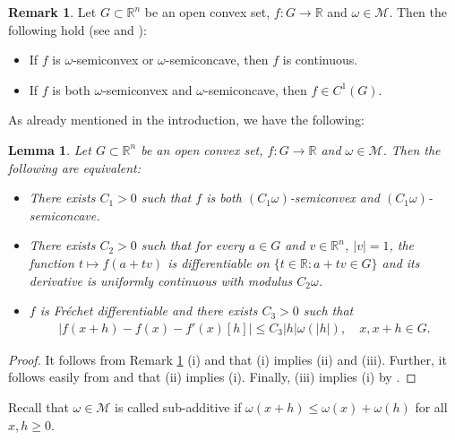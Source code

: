 \documentclass[10pt,a4paper]{amsart}
\newtheorem{lemma}[theorem]{Lemma}
\theoremstyle{definition}
\newtheorem{remark}[theorem]{Remark}
\newcommand{\R}{\mathbb{R}}
\newcommand{\M}{\mathcal{M}}
\begin{document}
\begin{remark}\label{re_continuous}
Let $ G\subset\R^n $ be an open convex set, $ f:G\to\R $ and $ \omega\in\M $. Then the following hold (see \cite[Theorem 2.1.7]{CS} and \cite[Theorem 3.3.7]{CS}):
\begin{itemize}
\item[(i)] If $ f $ is $ \omega $-semiconvex or $ \omega $-semiconcave, then $ f $ is continuous.
\item[(ii)] If $ f $ is both $ \omega $-semiconvex and $ \omega $-semiconcave, then $ f\in C^1(G) $.
\end{itemize}
\end{remark}

As already mentioned in the introduction, we have the following:

\begin{lemma}\label{le_lines}
Let $ G\subset\R^n $ be an open convex set, $ f:G\to\R $ and $ \omega\in\M $. Then the following are equivalent:
\begin{itemize}
\item[(i)] There exists $ C_1>0 $ such that $ f $ is both $ (C_1\omega) $-semiconvex and $ (C_1\omega) $-semiconcave.
\item[(ii)] There exists $ C_2>0 $ such that for every $ a\in G $ and $ v\in\R^n $, $ \vert v\vert=1 $, the function $ t\mapsto f(a+tv) $ is differentiable on $ \lbrace t\in\R:a+tv\in G\rbrace $ and its derivative is uniformly continuous with modulus $ C_2\omega $.
\item[(iii)] $ f $ is Fréchet differentiable and there exists $ C_3>0 $ such that
\begin{align*}
\vert f(x+h)-f(x)-f'(x)[h]\vert\leq C_3\vert h\vert\omega(\vert h\vert),\quad x,x+h\in G.
\end{align*}
\end{itemize}
\end{lemma}

\begin{proof}
It follows from Remark \ref{re_continuous} (i) and \cite[Proposition 6.4 (i), (iv)]{KZ} that (i) implies (ii) and (iii). Further, it follows easily from \cite[Lemma 2.3 (i)]{K} and \cite[Proposition 2.4 (ii)]{K} that (ii) implies (i). Finally, (iii) implies (i) by \cite[Proposition 6.4 (ii)]{KZ}.
\end{proof}


Recall that $ \omega\in\M $ is called sub-additive if $ \omega(x+h)\leq\omega(x)+\omega(h) $ for all $ x,h\geq 0 $.
\end{document}
